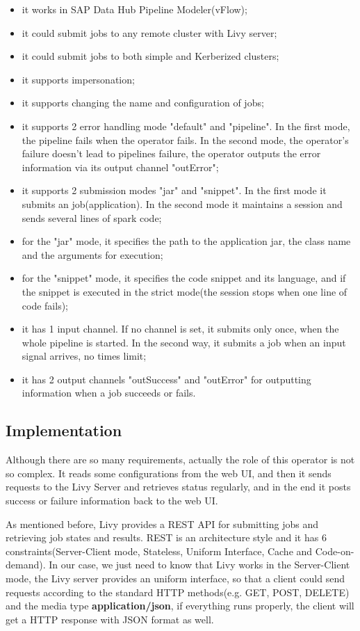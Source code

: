\documentclass[article,colorback,accentcolor=tud4c]{tudreport}
\begin{document}
	\begin{itemize}
		\item it works in SAP Data Hub Pipeline Modeler(vFlow);
		\item it could submit jobs to any remote cluster with Livy server;
		\item it could submit jobs to both simple and Kerberized clusters;
		\item it supports impersonation;
		\item it supports changing the name and configuration of jobs;
		\item it supports 2 error handling mode "default" and "pipeline". In the first mode, the pipeline fails when the operator fails. In the second mode, the operator's failure doesn't lead to pipelines failure, the operator outputs the error information via its output channel "outError";
		\item it supports 2 submission modes "jar" and "snippet". In the first mode it submits an job(application). In the second mode it maintains a session and sends several lines of spark code;
		\item for the "jar" mode, it specifies the path to the application jar, the class name and the arguments for execution;
		\item for the "snippet" mode, it specifies the code snippet and its language, and if the snippet is executed in the strict mode(the session stops when one line of code fails);
		\item it has 1 input channel. If no channel is set, it submits only once, when the whole pipeline is started. In the second way, it submits a job when an input signal arrives, no times limit;
		\item it has 2 output channels "outSuccess" and "outError" for outputting information when a job succeeds or fails.
	\end{itemize}
	
	\subsection{Implementation}
	
	Although there are so many requirements, actually the role of this operator is not so complex. It reads some configurations from the web UI, and then it sends requests to the Livy Server and retrieves status regularly, and in the end it posts success or failure information back to the web UI.
	
	As mentioned before, Livy provides a REST API for submitting jobs and retrieving job states and results. REST is an architecture style and it has 6 constraints(Server-Client mode, Stateless, Uniform Interface, Cache and Code-on-demand). In our case, we just need to know that Livy works in the Server-Client mode, the Livy server provides an uniform interface, so that a client could send requests according to the standard HTTP methods(e.g. GET, POST, DELETE) and the media type \textbf{application/json}, if everything runs properly, the client will get a HTTP response with JSON format as well.
	
\end{document}
